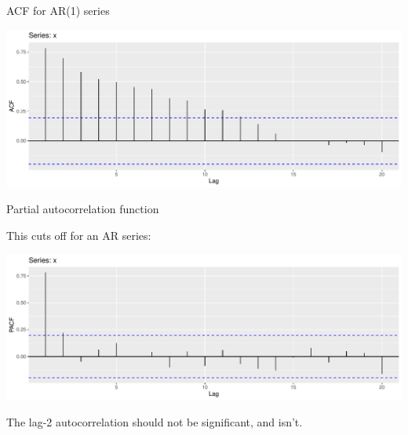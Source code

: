 \documentclass[
  ignorenonframetext,
]{beamer}
\newenvironment{Shaded}{\begin{snugshade}}{\end{snugshade}}
\newcommand{\DataTypeTok}[1]{\textcolor[rgb]{0.13,0.29,0.53}{#1}}
\newcommand{\KeywordTok}[1]{\textcolor[rgb]{0.13,0.29,0.53}{\textbf{#1}}}
\newcommand{\NormalTok}[1]{#1}
\newcommand{\OperatorTok}[1]{\textcolor[rgb]{0.81,0.36,0.00}{\textbf{#1}}}
\newcommand{\StringTok}[1]{\textcolor[rgb]{0.31,0.60,0.02}{#1}}
\begin{document}
\begin{frame}[fragile]{ACF for AR(1) series}
\protect\hypertarget{acf-for-ar1-series}{}

\begin{Shaded}
\end{Shaded}

\includegraphics{slides_d29_files/figure-beamer/unnamed-chunk-558-1.pdf}

\end{frame}

\begin{frame}[fragile]{Partial autocorrelation function}
\protect\hypertarget{partial-autocorrelation-function}{}

This cuts off for an AR series:

\begin{Shaded}
\end{Shaded}

\includegraphics{slides_d29_files/figure-beamer/unnamed-chunk-559-1.pdf}

The lag-2 autocorrelation should not be significant, and isn't.

\end{frame}
\end{document}
